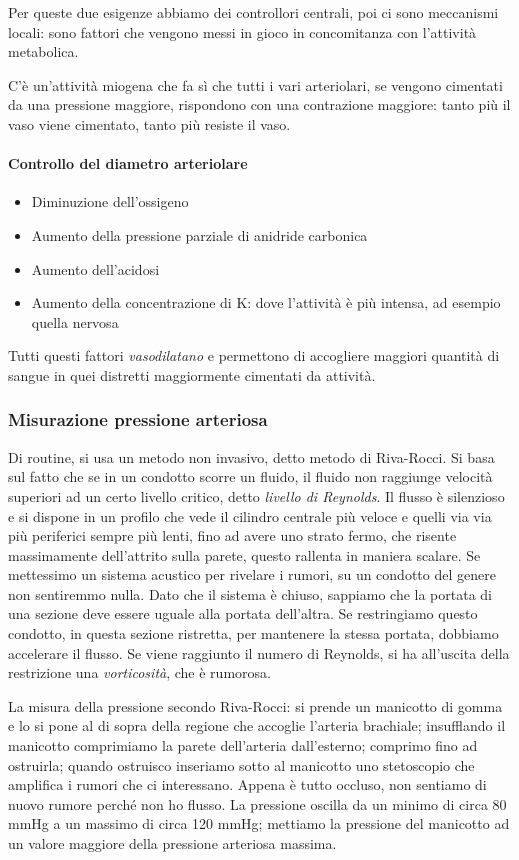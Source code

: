 \documentclass[a4paper,12pt]{article}
\begin{document}
Per queste due esigenze abbiamo dei controllori centrali, poi ci sono meccanismi locali: sono fattori che vengono messi in gioco in concomitanza con l'attività metabolica.

C'è un'attività miogena che fa sì che tutti i vari arteriolari, se vengono cimentati da una pressione maggiore, rispondono con una contrazione maggiore: tanto più il vaso viene cimentato, tanto più resiste il vaso.
\paragraph{Controllo del diametro arteriolare}
\begin{itemize}
\item{Diminuzione dell'ossigeno}
\item{Aumento della pressione parziale di anidride carbonica}
\item{Aumento dell'acidosi}
\item{Aumento della concentrazione di K: dove l'attività è più intensa, ad esempio quella nervosa}
\end{itemize}
Tutti questi fattori \emph{vasodilatano} e permettono di accogliere maggiori quantità di sangue in quei distretti maggiormente cimentati da attività.

\subsubsection{Misurazione pressione arteriosa}
Di routine, si usa un metodo non invasivo, detto metodo di Riva-Rocci. Si basa sul fatto che se in un condotto scorre un fluido, il fluido non raggiunge velocità superiori ad un certo livello critico, detto \emph{livello di Reynolds}. Il flusso è silenzioso e si dispone in un profilo che vede il cilindro centrale più veloce e quelli via via più periferici sempre più lenti, fino ad avere uno strato fermo, che risente massimamente dell'attrito sulla parete, questo rallenta in maniera scalare. Se mettessimo un sistema acustico per rivelare i rumori, su un condotto del genere non sentiremmo nulla. Dato che il sistema è chiuso, sappiamo che la portata di una sezione deve essere uguale alla portata dell'altra. Se restringiamo questo condotto, in questa sezione ristretta, per mantenere la stessa portata, dobbiamo accelerare il flusso. Se viene raggiunto il numero di Reynolds, si ha all'uscita della restrizione una \emph{vorticosità}, che è rumorosa.

La misura della pressione secondo Riva-Rocci: si prende un manicotto di gomma e lo si pone al di sopra della regione che accoglie l'arteria brachiale; insufflando il manicotto comprimiamo la parete dell'arteria dall'esterno; comprimo fino ad ostruirla; quando ostruisco inseriamo sotto al manicotto uno stetoscopio che amplifica i rumori che ci interessano. Appena è tutto occluso, non sentiamo di nuovo rumore perché non ho flusso. La pressione oscilla da un minimo di circa 80 mmHg a un massimo di circa 120 mmHg; mettiamo la pressione del manicotto ad un valore maggiore della pressione arteriosa massima.
\end{document}
